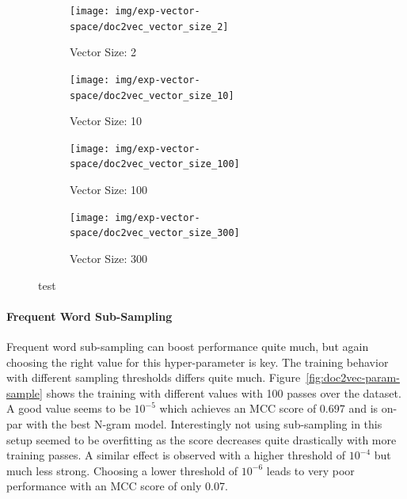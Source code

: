 \begin{figure}[h!]
    \centering
    \begin{subfigure}[b]{0.49\textwidth}
      \texttt{[image: img/exp-vector-space/doc2vec\_vector\_size\_2]}
      \caption{Vector Size: 2}
\label{fig:doc2vec_vector_size_2}
    \end{subfigure}
    \begin{subfigure}[b]{0.49\textwidth}
      \texttt{[image: img/exp-vector-space/doc2vec\_vector\_size\_10]}
      \caption{Vector Size: 10}
\label{fig:doc2vec_vector_size_10}
    \end{subfigure}
    \begin{subfigure}[b]{0.49\textwidth}
      \texttt{[image: img/exp-vector-space/doc2vec\_vector\_size\_100]}
      \caption{Vector Size: 100}
\label{fig:doc2vec_vector_size_100}
  \end{subfigure}
  \begin{subfigure}[b]{0.49\textwidth}
    \texttt{[image: img/exp-vector-space/doc2vec\_vector\_size\_300]}
    \caption{Vector Size: 300}
\label{fig:doc2vec_vector_size_300}
  \end{subfigure}
\caption{test}
\label{fig:doc2vec_vector_size}
\end{figure}

\paragraph{Frequent Word Sub-Sampling}
Frequent word sub-sampling can boost performance quite much, but again choosing the right value for this hyper-parameter is key. The training behavior with different sampling thresholds differs quite much. Figure~\ref{fig:doc2vec-param-sample} shows the training with different values with 100 passes over the dataset. A good value seems to be $10^{-5}$ which achieves an MCC score of 0.697 and is on-par with the best N-gram model. Interestingly not using sub-sampling in this setup seemed to be overfitting as the score decreases quite drastically with more training passes. A similar effect is observed with a higher threshold of $10^{-4}$ but much less strong. Choosing a lower threshold of $10^{-6}$ leads to very poor performance with an MCC score of only 0.07.


